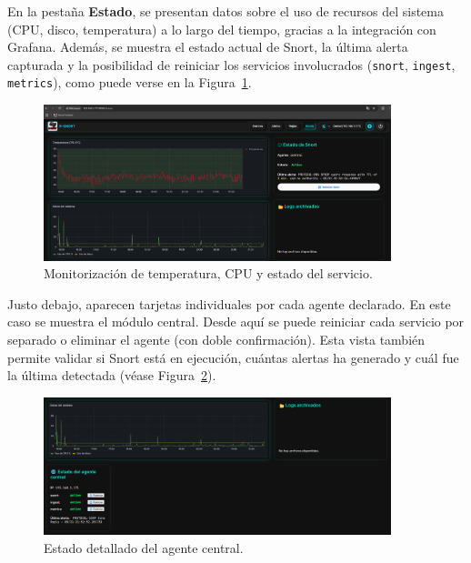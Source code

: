 \documentclass[11pt,a4paper,twoside]{report}
\begin{document}
\newpage

En la pestaña \textbf{Estado}, se presentan datos sobre el uso de recursos del sistema (CPU, disco, temperatura) a lo largo del tiempo, gracias a la integración con Grafana. Además, se muestra el estado actual de Snort, la última alerta capturada y la posibilidad de reiniciar los servicios involucrados (\texttt{snort}, \texttt{ingest}, \texttt{metrics}), como puede verse en la Figura~\ref{fig:estado-central}.

\begin{figure}[H]
	\centering
	\includegraphics[width=0.9\textwidth]{configuracion/5.png}
	\caption{Monitorización de temperatura, CPU y estado del servicio.}
	\label{fig:estado-central}
\end{figure}

Justo debajo, aparecen tarjetas individuales por cada agente declarado. En este caso se muestra el módulo central. Desde aquí se puede reiniciar cada servicio por separado o eliminar el agente (con doble confirmación). Esta vista también permite validar si Snort está en ejecución, cuántas alertas ha generado y cuál fue la última detectada (véase Figura~\ref{fig:estado-agente-central}).

\begin{figure}[H]
	\centering
	\includegraphics[width=0.9\textwidth]{configuracion/6.png}
	\caption{Estado detallado del agente central.}
	\label{fig:estado-agente-central}
\end{figure}

\newpage
\end{document}
